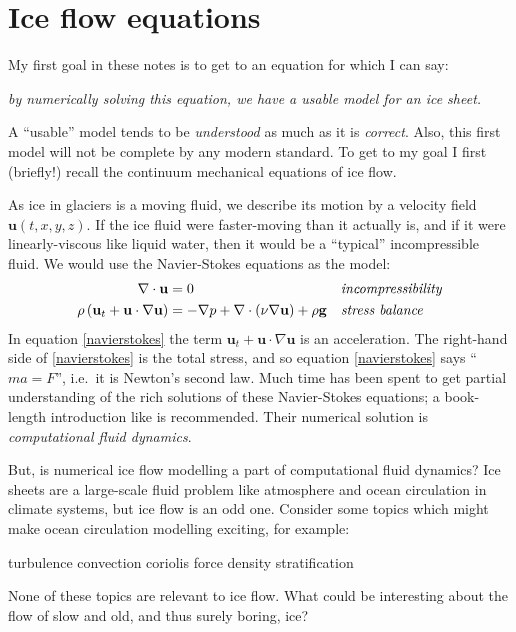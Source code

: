 \documentclass[letterpaper,final,12pt,reqno]{amsart}
\begin{document}
\section{Ice flow equations}

My first goal in these notes is to get to an equation for which I can say:
\begin{center}
\emph{by numerically solving this equation, we have a usable model for an ice sheet.}
\end{center}
\noindent A ``usable'' model tends to be \emph{understood} as much as it is \emph{correct}.  Also, this first model will not be complete by any modern standard.  To get to my goal I first (briefly!) recall the continuum mechanical equations of ice flow.  

As ice in glaciers is a moving fluid, we describe its motion by a velocity field $\mathbf{u}(t,x,y,z)$.  If the ice fluid were faster-moving than it actually is, and if it were linearly-viscous like liquid water, then it would be a ``typical'' incompressible fluid.  We would use the Navier-Stokes equations as the model:
\begin{align}
\nabla \cdot \mathbf{u} &= 0 &&\text{\emph{incompressibility}} \label{incompressible} \\
\rho \left(\mathbf{u}_t + \mathbf{u}\cdot\nabla \mathbf{u}\right) &= -\nabla p + \nabla \cdot (\nu \nabla \mathbf{u}) + \rho \mathbf{g} &&\text{\emph{stress balance}} \label{navierstokes}
\end{align}
In equation \eqref{navierstokes} the term $\mathbf{u}_t + \mathbf{u}\cdot\nabla \mathbf{u}$ is an acceleration.  The right-hand side of \eqref{navierstokes} is the total stress, and so equation \eqref{navierstokes} says ``$ma=F$'', i.e.~it is Newton's second law.  Much time has been spent to get partial understanding of the rich solutions of these Navier-Stokes equations; a book-length introduction like \cite{Acheson} is recommended.  Their numerical solution is \emph{computational fluid dynamics}.

But, is numerical ice flow modelling a part of computational fluid dynamics?  Ice sheets are a large-scale fluid problem like atmosphere and ocean circulation in climate systems, but ice flow is an odd one.  Consider some topics which might make ocean circulation modelling exciting, for example:
  \begin{center} turbulence \qquad convection \qquad  coriolis force  \qquad density stratification
  \end{center}
None of these topics are relevant to ice flow.  What could be interesting about the flow of slow and old, and thus surely boring, ice?
\end{document}
